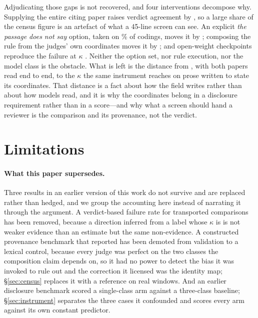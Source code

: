\documentclass[11pt]{article}
\begin{document}
Adjudicating those gaps is not recovered, and four interventions decompose why.
Supplying the entire citing paper raises verdict agreement by \LadVdDeltaCite{}
\LadVdDeltaCiteCI{}, so a large share of the census figure is an artefact of
what a \mbox{45-line} screen can see. An explicit \emph{the passage does not
say} option, taken on \AbsShare\% of codings, moves it by \AbsKDiff{}
\AbsKDiffCI{}; composing the rule from the judges' own coordinates moves it by
\RuleKDiff{} \RuleKDiffCI{}; and \OwjNOpen{} open-weight checkpoints reproduce
the failure at $\kappa$ \OwjKOpen{}. Neither the option set, nor rule execution,
nor the model class is the obstacle. What is left is the distance from
\LadVdCiteK{}, with both papers read end to end, to the $\kappa$ \InsFullK{} the
same instrument reaches on prose written to state its coordinates. That distance
is a fact about how the field writes rather than about how models read, and it
is why the coordinates belong in a disclosure requirement rather than in a
score---and why what a screen should hand a reviewer is the comparison and its
provenance, not the verdict.

\section*{Limitations}

\paragraph{What this paper supersedes.}
Three results in an earlier version of this work do not survive and are replaced
rather than hedged, and we group the accounting here instead of narrating it
through the argument. A verdict-based failure rate for transported comparisons
has been removed, because a direction inferred from a label whose $\kappa$ is
\DecVerdictK{} is not weaker evidence than an estimate but the same
non-evidence. A constructed provenance benchmark that reported \PvAcc{} has been
demoted from validation to a lexical control, because every judge was perfect on
the two classes the composition claim depends on, so it had no power to detect
the bias it was invoked to rule out and the correction it licensed was the
identity map; \S\ref{sec:census} replaces it with a reference on real windows.
And an earlier disclosure benchmark scored a single-class arm against a
three-class baseline; \S\ref{sec:instrument} separates the three cases it
confounded and scores every arm against its own constant predictor.
\end{document}
